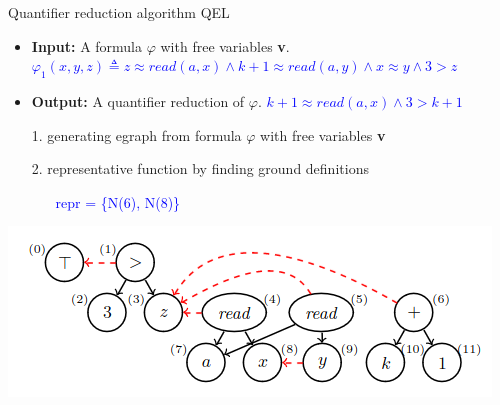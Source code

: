 \documentclass{beamer}
\begin{document}
\begin{frame}{Quantifier reduction algorithm QEL}

\begin{center}
\begin{itemize}
    \item \textbf{Input:} A formula $\varphi$ with free variables \textbf{v}. 
    \textcolor{blue}{$\varphi_1 (x,y,z) \triangleq z \approx read(a,x) \land k + 1 \approx read(a,y) \land x \approx y \land 3 > z$}
    \item \textbf{Output:} A quantifier reduction of $\varphi$.
    \textcolor{blue}{$k+1 \approx read(a,x) \land 3 > k+1$}
    \item[1.] generating egraph from formula $\varphi$ with free variables
    \textbf{v}
    \item[2.] representative function by finding ground definitions
    \begin{itemize}
        \item[] \textcolor{blue}{repr = \{N(6), N(8)\}}
    \end{itemize}
\end{itemize}
\end{center}
\begin{center}
\includegraphics[scale=0.4]{FMI1.png}
\end{center}

\end{frame}
\end{document}
